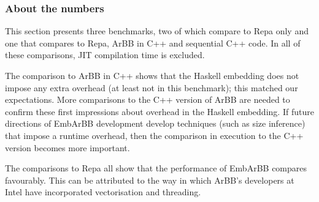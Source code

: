\subsubsection{About the numbers} 
This section presents three benchmarks, two of which compare to Repa only and 
one that compares to Repa, ArBB in C++ and sequential C++ code. In all of these comparisons,
JIT compilation time is excluded.

The comparison to ArBB in C++ shows that the Haskell embedding does not impose any 
extra overhead (at least not in this benchmark); this matched our expectations. More comparisons to the C++ version of ArBB are needed to confirm these first impressions about overhead in the Haskell embedding. If future directions of EmbArBB development develop techniques (such as size inference) that impose a runtime overhead, then the 
comparison in execution to the C++ version becomes more important. 

The comparisons to Repa all show that the performance of EmbArBB compares favourably. This can be attributed to the way in which ArBB's developers at Intel have incorporated vectorisation and threading. 
 








 




 

